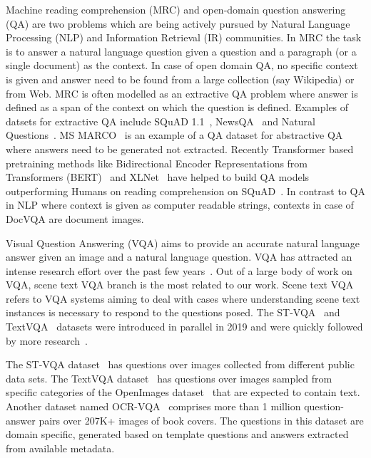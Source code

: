 \documentclass[10pt,twocolumn,letterpaper]{article}
\newcommand{\datasetName}{DocVQA\xspace}
\newcommand{\squad}{SQuAD 1.1\xspace}
\newcommand{\textvqa}{TextVQA\xspace}
\newcommand{\stvqa}{ST-VQA\xspace}
\begin{document}
Machine reading comprehension (MRC) and open-domain question answering (QA) are two problems which are being actively pursued by Natural Language Processing (NLP) and Information Retrieval (IR) communities.
In MRC the task is to answer a natural language question given a question and a paragraph (or a single document) as the context. In case of open domain QA, no specific context is given and answer need to be found from a large collection (say Wikipedia) or from Web. 
MRC is often modelled as an extractive QA problem where answer is defined as a span of the context on which the question is defined. 
Examples of datsets for extractive QA include \squad~\cite{squad},  NewsQA~\cite{newsqa} and Natural Questions~\cite{naturalquestions}. MS MARCO~\cite{ms_marco} is an example of a QA dataset for abstractive QA where answers need to be generated not extracted. Recently Transformer based pretraining  methods like  Bidirectional Encoder Representations from Transformers (BERT)~\cite{bert} and XLNet~\cite{xlnet} have helped to build QA models outperforming Humans on reading comprehension on SQuAD~\cite{squad}. In contrast to QA in NLP where context is given as computer readable strings, contexts in case of \datasetName are document images.


Visual Question Answering (VQA) aims to provide an accurate natural language answer given an image and a natural language question. VQA has attracted an intense research effort over the past few years~\cite{vqa2, agrawal2017c, johnson2017clevr}.
Out of a large body of work on VQA, scene text VQA branch is the most related to our work.
Scene text VQA refers to VQA systems aiming to deal with cases where understanding scene text instances is necessary to respond to the questions posed. The \stvqa~\cite{stvqa_iccv} and \textvqa~\cite{textvqa} datasets were introduced in parallel in 2019 and were quickly followed by more research~\cite{singh2019strings, gao2020multi, wang2020general}.


The \stvqa dataset~\cite{stvqa_iccv} has  questions over  images collected from different public data sets. The \textvqa dataset~\cite{textvqa} has  questions over   images sampled from specific categories of the OpenImages dataset~\cite{OpenImages2} that are expected to contain text.
Another dataset named OCR-VQA~\cite{mishra2019ocr} comprises more than 1 million question-answer pairs over 207K+ images of book covers. The questions in this dataset are domain specific, generated based on template questions and answers extracted from available metadata. 
\end{document}
